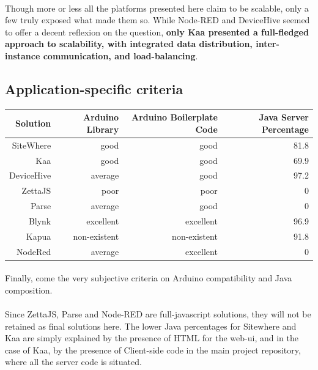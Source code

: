 \documentclass{article}
\begin{document}
\paragraph{} Though more or less all the platforms presented here claim to be scalable, only a few truly exposed what made them so. While Node-RED and DeviceHive seemed to offer a decent reflexion on the question, \textbf{only Kaa presented a full-fledged approach to scalability, with integrated data distribution, inter-instance communication, and load-balancing}.

\subsection{Application-specific criteria}

\begin{center}
\begin{tabular}{r|r|r|r}
Solution & Arduino Library & Arduino Boilerplate Code & Java Server Percentage \\ \hline
SiteWhere & \cellcolor{blue!10}good & \cellcolor{blue!10}good & \cellcolor{green!25}81.8 \\
Kaa & \cellcolor{blue!10}good & \cellcolor{blue!10}good & \cellcolor{green!25}69.9 \\
DeviceHive & \cellcolor{yellow!25}average & \cellcolor{blue!10}good & \cellcolor{green!25}97.2 \\
ZettaJS & \cellcolor{orange!25}poor & \cellcolor{orange!25}poor & \cellcolor{red!25}0 \\
Parse & \cellcolor{yellow!25}average & \cellcolor{blue!10}good & \cellcolor{red!25}0 \\
Blynk & \cellcolor{green!25}excellent & \cellcolor{green!25}excellent & \cellcolor{green!25}96.9 \\
Kapua & \cellcolor{red!25}non-existent & \cellcolor{red!25}non-existent & \cellcolor{green!25}91.8 \\
NodeRed & \cellcolor{yellow!25}average & \cellcolor{green!25}excellent & \cellcolor{red!25}0 \\
\end{tabular}
\end{center}

\paragraph{} Finally, come the very subjective criteria on Arduino compatibility and Java composition.

\paragraph{} Since ZettaJS, Parse and Node-RED are full-javascript solutions, they will not be retained as final solutions here. The lower Java percentages for Sitewhere and Kaa are simply explained by the presence of HTML for the web-ui, and in the case of Kaa, by the presence of Client-side code in the main project repository, where all the server code is situated.
\end{document}
